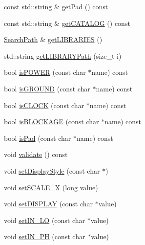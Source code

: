 \begin{DoxyCompactItemize}
\item 
const std\+::string \& \mbox{\hyperlink{classCRL_1_1Environment_a5f0df5fadd73c2246f7e6775314bb5fa}{get\+Pad}} () const
\item 
const std\+::string \& \mbox{\hyperlink{classCRL_1_1Environment_a3bb5c9e02c1391142e439f023bdc0355}{get\+C\+A\+T\+A\+L\+OG}} () const
\item 
\mbox{\hyperlink{classCRL_1_1SearchPath}{Search\+Path}} \& \mbox{\hyperlink{classCRL_1_1Environment_acf7a3bc42cfb4b98f1da859ed27ca97e}{get\+L\+I\+B\+R\+A\+R\+I\+ES}} ()
\item 
std\+::string \mbox{\hyperlink{classCRL_1_1Environment_afe29d7cab0055cabb7667eabcbdd32db}{get\+L\+I\+B\+R\+A\+R\+Y\+Path}} (size\+\_\+t i)
\item 
bool \mbox{\hyperlink{classCRL_1_1Environment_a9eb93e10f79278b4642fc9815a83fdff}{is\+P\+O\+W\+ER}} (const char $\ast$name) const
\item 
bool \mbox{\hyperlink{classCRL_1_1Environment_a4cad6f06ac67c1a688b0b98dfa57d7ea}{is\+G\+R\+O\+U\+ND}} (const char $\ast$name) const
\item 
bool \mbox{\hyperlink{classCRL_1_1Environment_a9ae0d48d88797a7a5421edf5978bf3d7}{is\+C\+L\+O\+CK}} (const char $\ast$name) const
\item 
bool \mbox{\hyperlink{classCRL_1_1Environment_a6f1ce36d1636f2ec701b0904f461e6b7}{is\+B\+L\+O\+C\+K\+A\+GE}} (const char $\ast$name) const
\item 
bool \mbox{\hyperlink{classCRL_1_1Environment_a8a82d0a983c502e1dc97944ab496d8e5}{is\+Pad}} (const char $\ast$name) const
\item 
void \mbox{\hyperlink{classCRL_1_1Environment_a4ea88dd9784318190a3705345c47904a}{validate}} () const
\item 
void \mbox{\hyperlink{classCRL_1_1Environment_a85fa721541a39571c3ade06992035bad}{set\+Display\+Style}} (const char $\ast$)
\item 
void \mbox{\hyperlink{classCRL_1_1Environment_ad14d519b0a4c964d7a786739499571dd}{set\+S\+C\+A\+L\+E\+\_\+X}} (long value)
\item 
void \mbox{\hyperlink{classCRL_1_1Environment_a69416219076a00900f58d0d5e0ac55a9}{set\+D\+I\+S\+P\+L\+AY}} (const char $\ast$value)
\item 
void \mbox{\hyperlink{classCRL_1_1Environment_ad204e8f425d3a35bba494a60d4b4ff69}{set\+I\+N\+\_\+\+LO}} (const char $\ast$value)
\item 
void \mbox{\hyperlink{classCRL_1_1Environment_a62965d987f17d2853afd44004ff20b1b}{set\+I\+N\+\_\+\+PH}} (const char $\ast$value)

\end{DoxyCompactItemize}
